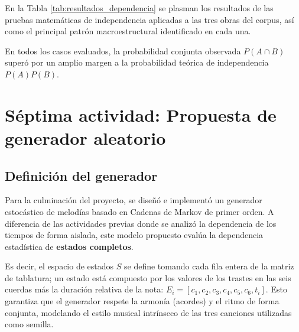 \documentclass{article}
\theoremstyle{plain}
\theoremstyle{definition}
\begin{document}
En la Tabla \ref{tab:resultados_dependencia} se plasman los resultados de las pruebas matemáticas de independencia aplicadas a las tres obras del corpus, así como el principal patrón macroestructural identificado en cada una. 

En todos los casos evaluados, la probabilidad conjunta observada $P(A \cap B)$ superó por un amplio margen a la probabilidad teórica de independencia $P(A)P(B)$. 

\begin{table}[H]
    \centering
    \caption{Resumen de la prueba de independencia y patrones macroestructurales del corpus.}
    \label{tab:resultados_dependencia}
\end{table}
\section*{Séptima actividad: Propuesta de generador aleatorio}

\subsection*{Definición del generador}
Para la culminación del proyecto, se diseñó e implementó un generador estocástico de melodías basado en Cadenas de Markov de primer orden. A diferencia de las actividades previas donde se analizó la dependencia de los tiempos de forma aislada, este modelo propuesto evalúa la dependencia estadística de \textbf{estados completos}.

Es decir, el espacio de estados $S$ se define tomando cada fila entera de la matriz de tablatura; un estado está compuesto por los valores de los trastes en las seis cuerdas más la duración relativa de la nota: $E_i = [c_1, c_2, c_3, c_4, c_5, c_6, t_i]$. Esto garantiza que el generador respete la armonía (acordes) y el ritmo de forma conjunta, modelando el estilo musical intrínseco de las tres canciones utilizadas como semilla.
\end{document}
